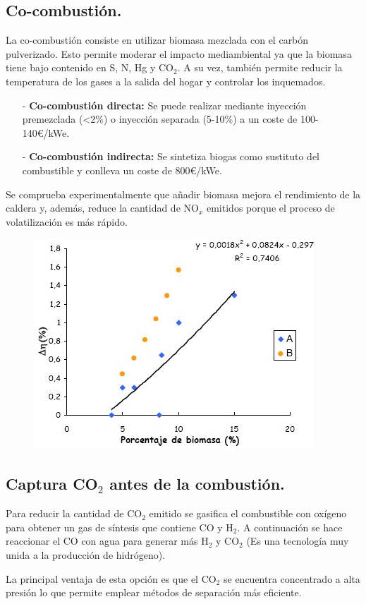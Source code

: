 \subsection{Co-combustión.}
La co-combustión consiste en utilizar biomasa mezclada con el carbón pulverizado. Esto permite moderar el impacto mediambiental ya que la biomasa tiene bajo contenido en S, N, Hg y CO$_2$. A su vez, también permite reducir la temperatura de los gases a la salida del hogar y controlar los inquemados.
\begin{itemize}
	\item [-]\textbf{Co-combustión directa:}
	Se puede realizar mediante inyección premezclada (<2\%) o inyección separada (5-10\%) a un coste de 100-140€/kWe.
	
	\item [-]\textbf{Co-combustión indirecta:}
	Se sintetiza biogas como sustituto del combustible y conlleva un coste de 800€/kWe.
\end{itemize}
Se comprueba experimentalmente que añadir biomasa mejora el rendimiento de la caldera y, además, reduce la cantidad de NO$_x$ emitidos porque el proceso de volatilización es más rápido.
\begin{figure}[H]
	\centering
	\includegraphics[width=0.5\linewidth]{res/tema3/influenciaBiomasa}
	\label{fig:influenciabiomasa}
\end{figure}

\subsection{Captura CO$_2$ antes de la combustión.}
Para reducir la cantidad de CO$_2$ emitido se gasifica el combustible con oxígeno para obtener un gas de síntesis que contiene CO y H$_2$. A continuación se hace reaccionar el CO con agua para generar más H$_2$ y CO$_2$ (Es una tecnología muy unida a la producción de hidrógeno).

La principal ventaja de esta opción es que el CO$_2$ se encuentra concentrado a alta presión lo que permite emplear métodos de separación más eficiente.


